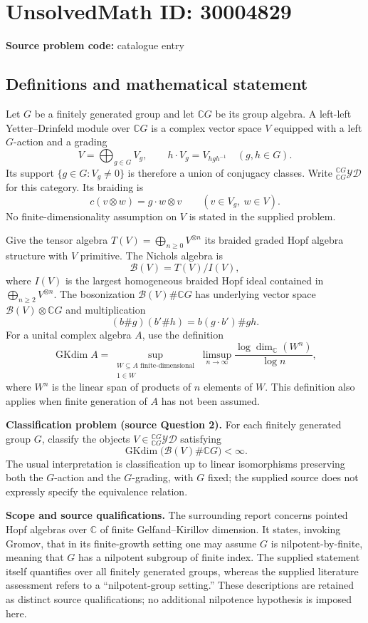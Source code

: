 \documentclass[11pt]{article}
\newcommand{\C}{\mathbb{C}}
\begin{document}
\section*{UnsolvedMath ID: 30004829}
\textbf{Source problem code:} catalogue entry
\subsection{Definitions and mathematical statement}
Let \(G\) be a finitely generated group and let \(\C G\) be its group algebra. A left-left Yetter--Drinfeld module over \(\C G\) is a complex vector space \(V\) equipped with a left \(G\)-action and a grading
\[
V=\bigoplus_{g\in G}V_g,\qquad h\cdot V_g=V_{hgh^{-1}}\quad(g,h\in G).
\]
Its support \(\{g\in G:V_g\ne0\}\) is therefore a union of conjugacy classes. Write \({}^{\C G}_{\C G}\mathcal{YD}\) for this category. Its braiding is
\[
c(v\otimes w)=g\cdot w\otimes v\qquad(v\in V_g,\ w\in V).
\]
No finite-dimensionality assumption on \(V\) is stated in the supplied problem.

Give the tensor algebra \(T(V)=\bigoplus_{n\ge0}V^{\otimes n}\) its braided graded Hopf algebra structure with \(V\) primitive. The Nichols algebra is
\[
\mathcal B(V)=T(V)/I(V),
\]
where \(I(V)\) is the largest homogeneous braided Hopf ideal contained in \(\bigoplus_{n\ge2}V^{\otimes n}\). The bosonization \(\mathcal B(V)\#\C G\) has underlying vector space \(\mathcal B(V)\otimes\C G\) and multiplication
\[
(b\#g)(b'\#h)=b(g\cdot b')\#gh.
\]
For a unital complex algebra \(A\), use the definition
\[
\operatorname{GKdim}A=
\sup_{\substack{W\subseteq A\text{ finite-dimensional}\\1\in W}}
\limsup_{n\to\infty}\frac{\log\dim_{\C}(W^n)}{\log n},
\]
where \(W^n\) is the linear span of products of \(n\) elements of \(W\). This definition also applies when finite generation of \(A\) has not been assumed.

\textbf{Classification problem (source Question 2).} For each finitely generated group \(G\), classify the objects \(V\in{}^{\C G}_{\C G}\mathcal{YD}\) satisfying
\[
\operatorname{GKdim}\bigl(\mathcal B(V)\#\C G\bigr)<\infty.
\]
The usual interpretation is classification up to linear isomorphisms preserving both the \(G\)-action and the \(G\)-grading, with \(G\) fixed; the supplied source does not expressly specify the equivalence relation.

\textbf{Scope and source qualifications.} The surrounding report concerns pointed Hopf algebras over \(\C\) of finite Gelfand--Kirillov dimension. It states, invoking Gromov, that in its finite-growth setting one may assume \(G\) is nilpotent-by-finite, meaning that \(G\) has a nilpotent subgroup of finite index. The supplied statement itself quantifies over all finitely generated groups, whereas the supplied literature assessment refers to a ``nilpotent-group setting.'' These descriptions are retained as distinct source qualifications; no additional nilpotence hypothesis is imposed here.
\end{document}

